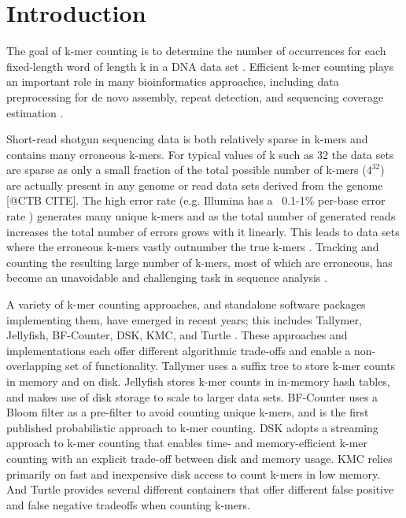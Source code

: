 \documentclass{article}
\begin{document}
\section{Introduction}

The goal of k-mer counting is to determine the number of occurrences
for each fixed-length word of length k in a DNA data set
\cite{Marcais2011}. Efficient k-mer counting plays an important role
in many bioinformatics approaches, including data preprocessing for de
novo assembly, repeat detection, and sequencing coverage estimation
\cite{Kurtz2008}.


Short-read shotgun sequencing data is both relatively sparse in
k-mers and contains many erroneous k-mers.  For typical values of k such as 32 the data sets are sparse as only a small fraction of
the total possible number of k-mers ($4^{32}$) are actually present in
any genome or read data sets derived from the genome [@CTB CITE].  The high error rate (e.g. Illumina has a ~0.1-1\%
per-base error rate \cite{pubmed19997069}) generates many unique k-mers and as the total number of generated reads increases the
total number of errors grows with it linearly. This leads to data sets where the
erroneous k-mers vastly outnumber the true k-mers \cite{Conway2011}.
Tracking and counting the resulting large number of k-mers, most of
which are erroneous, has become an unavoidable and challenging task
in sequence analysis
\cite{Minoche2011}.

A variety of k-mer counting approaches, and standalone software
packages implementing them, have emerged in recent years; this
includes Tallymer, Jellyfish, BF-Counter, DSK, KMC, and Turtle \cite{Kurtz2008,Marcais2011, Melsted2011, Rizk2013, Deorowicz2013, Roy2013}.
These
approaches and implementations each offer different algorithmic
trade-offs and enable a non-overlapping set
of functionality.  Tallymer uses a suffix tree to store k-mer counts
in memory and on disk.  Jellyfish stores k-mer counts in in-memory
hash tables, and makes use of disk storage to scale to larger
data sets.  BF-Counter uses a Bloom filter as a pre-filter to avoid
counting unique k-mers, and is the first published probabilistic approach
to k-mer counting.  DSK adopts a streaming approach to k-mer counting that
enables time- and memory-efficient k-mer counting with an explicit
trade-off between disk and memory usage.  KMC relies primarily
on fast and inexpensive disk access to count k-mers in low
memory.  And Turtle provides several different containers that offer
different false positive and false negative tradeoffs when counting k-mers.
\end{document}
